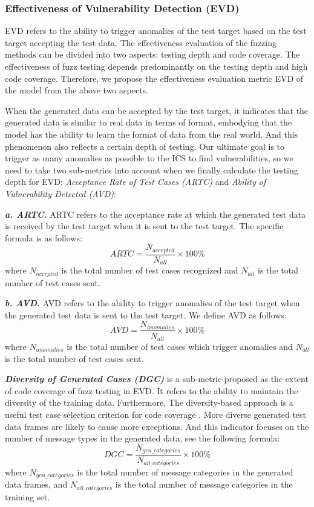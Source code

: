 \subsubsection{\textbf{Effectiveness of Vulnerability Detection (EVD)}}
EVD refers to the ability to trigger anomalies of the test target based on the test target accepting the test data. The effectiveness evaluation of the fuzzing methods can be divided into two aspects: testing depth and code coverage. The effectiveness of fuzz testing depends predominantly on the testing depth and high code coverage. Therefore, we propose the effectiveness evaluation metric EVD of the model from the above two aspects.

When the generated data can be accepted by the test target, it indicates that the generated data is similar to real data in terms of format, embodying that the model has the ability to learn the format of data from the real world. And this phenomenon also reflects a certain depth of testing. Our ultimate goal is to trigger as many anomalies as possible to the ICS to find vulnerabilities, so we need to take two sub-metrics into account when we finally calculate the testing depth for EVD: \textit{Acceptance Rate of Test Cases (ARTC)} and \textit{Ability of Vulnerability Detected (AVD)}:

\quad \textit{\textbf{a. ARTC.}} ARTC refers to the acceptance rate at which the generated test data is received by the test target when it is sent to the test target. The specific formula is as follows:
\begin{equation}
ARTC = \frac{{N_{accepted}}}{{N_{all}}} \times 100\%  
\end{equation}
where ${N_{accepted}}$ is the total number of test cases recognized and ${N_{all}}$ is the total number of test cases sent.

\quad \textit{\textbf{b. AVD.}} AVD refers to the ability to trigger anomalies of the test target when the generated test data is sent to the test target. We define AVD as follows:
\begin{equation}
AVD = \frac{{N_{anomalies}}}{{N_{all}}} \times 100\%  
\end{equation}
where ${N_{anomalies}}$ is the total number of test cases which trigger anomalies and ${N_{all}}$ is the total number of test cases sent.

\textit{\textbf{Diversity of Generated Cases (DGC)}} is a sub-metric proposed as the extent of code coverage of fuzz testing in EVD. It refers to the ability to maintain the diversity of the training data. Furthermore, The diversity-based approach is a useful test case selection criterion for code coverage \cite{hemmati2013achieving} \cite{mondal2015exploring} . More diverse generated test data frames are likely to cause more exceptions. And this indicator focuses on the number of message types in the generated data, see the following formula: 
\begin{equation}
DGC = \frac{{N_{gen\_categories}}}{{N_{all\_categories}}} \times 100\% 
\end{equation}
where $N_{gen\_categories}$ is the total number of message categories in the generated data frames, and $N_{all\_categories}$ is the total number of message categories in the training set.

